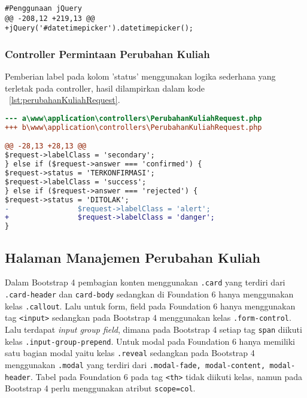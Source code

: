 \begin{lstlisting}
#Penggunaan jQuery
@@ -208,12 +219,13 @@
+jQuery('#datetimepicker').datetimepicker();
\end{lstlisting}

\subsubsection{Controller Permintaan Perubahan Kuliah}
Pemberian label pada kolom 'status' menggunakan logika sederhana yang terletak pada controller, hasil dilampirkan dalam kode ~\ref{lst:perubahanKuliahRequest}.
\begin{lstlisting}[language=diff, caption=Controller Request Perubahan Kuliah,  basicstyle=\ttfamily, frame=single,
columns=fullflexible, keepspaces=true, breaklines=true, label={lst:perubahanKuliahRequest}]
--- a\www\application\controllers\PerubahanKuliahRequest.php
+++ b\www\application\controllers\PerubahanKuliahRequest.php

@@ -28,13 +28,13 @@
$request->labelClass = 'secondary';
} else if ($request->answer === 'confirmed') {
$request->status = 'TERKONFIRMASI';
$request->labelClass = 'success';
} else if ($request->answer === 'rejected') {
$request->status = 'DITOLAK';
-                $request->labelClass = 'alert';
+                $request->labelClass = 'danger';
}
\end{lstlisting}

\subsection{Halaman Manajemen Perubahan Kuliah}
Dalam Bootstrap 4 pembagian konten menggunakan \texttt{.card} yang terdiri dari \texttt{.card-header} dan \texttt{card-body} sedangkan di Foundation 6 hanya menggunakan kelas \texttt{.callout}. 
Lalu untuk form, field pada Foundation 6 hanya menggunakan tag \texttt{<input>} sedangkan pada Bootstrap 4 menggunakan kelas \texttt{.form-control}.
Lalu terdapat \textit{input group field}, dimana pada Bootstrap 4 setiap tag \texttt{span} diikuti kelas \texttt{.input-group-prepend}.
Untuk modal pada Foundation 6 hanya memiliki satu bagian modal yaitu kelas \texttt{.reveal} sedangkan pada Bootstrap 4 menggunakan \texttt{.modal} yang terdiri dari \texttt{.modal-fade, modal-content, modal-header}.
Tabel pada Foundation 6 pada tag \texttt{<th>} tidak diikuti kelas, namun pada Bootstrap 4 perlu menggunakan atribut \texttt{scope=col}.

